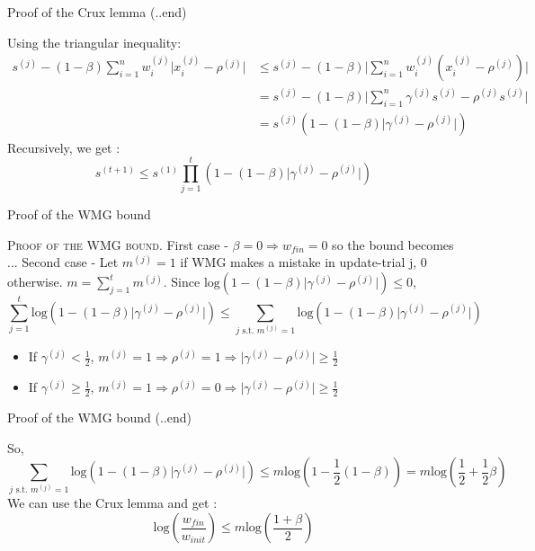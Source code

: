 \documentclass{beamer}
\begin{document}
\begin{frame}{Proof of the Crux lemma (..end)}

Using the triangular inequality:
\begin{align*}
s^{(j)} - (1 - \beta)\sum_{i=1}^{n} w_i^{(j)}\lvert x_i^{(j)}-\rho^{(j)}\rvert &\leq s^{(j)} - (1 - \beta)\lvert\sum_{i=1}^{n} w_i^{(j)}(x_i^{(j)}-\rho^{(j)})\rvert\\
																																						&= s^{(j)} - (1 - \beta)\lvert\sum_{i=1}^{n} \gamma^{(j)}s^{(j)}-\rho^{(j)}s^{(j)}\rvert\\
																																						&= s^{(j)}(1 - (1 - \beta)\lvert\gamma^{(j)} -\rho^{(j)}\rvert)
\end{align*}
Recursively, we get :
\[s^{(t+1)} \leq s^{(1)}\prod_{j=1}^{t}(1 - (1 - \beta)\lvert\gamma^{(j)} -\rho^{(j)}\rvert)\]
\end{frame}

\begin{frame}{Proof of the WMG bound}

\textsc{Proof of the WMG bound}.
First case - $\beta = 0 \Rightarrow w_{fin} = 0$ so the bound becomes ...
Second case - Let $m^{(j)} = 1$ if WMG makes a mistake in update-trial j, 0 otherwise. $m=\sum_{j=1}^{t} m^{(j)}$.\newline
Since $\mathrm{log}(1-(1-\beta)\lvert\gamma^{(j)} - \rho^{(j)}\rvert)\leq 0$,
\[\sum_{j=1}^{t}\mathrm{log}(1-(1-\beta)\lvert\gamma^{(j)} - \rho^{(j)}\rvert)\leq \sum_{j\text{ s.t. }m^{(j)}=1}\mathrm{log}(1-(1-\beta)\lvert\gamma^{(j)} - \rho^{(j)}\rvert)\]
\begin{itemize}
\item If $\gamma^{(j)}<\frac{1}{2}$, $m^{(j)}=1\Rightarrow\rho^{(j)}=1\Rightarrow\lvert\gamma^{(j)} - \rho^{(j)}\rvert\geq\frac{1}{2}$
\item If $\gamma^{(j)}\geq\frac{1}{2}$, $m^{(j)}=1\Rightarrow\rho^{(j)}=0\Rightarrow\lvert\gamma^{(j)} - \rho^{(j)}\rvert\geq\frac{1}{2}$
\end{itemize}

\end{frame}

\begin{frame}{Proof of the WMG bound (..end)}

So, 
\[\sum_{j\text{ s.t. }m^{(j)}=1}\mathrm{log}(1-(1-\beta)\lvert\gamma^{(j)} - \rho^{(j)}\rvert)\leq m\mathrm{log}(1-\frac{1}{2}(1-\beta)) = m\mathrm{log}(\frac{1}{2}+\frac{1}{2}\beta)\]
We can use the Crux lemma and get :
\[\mathrm{log}(\frac{w_{fin}}{w_{init}})\leq m\mathrm{log}(\frac{1+\beta}{2})\]

\end{frame}
\end{document}
